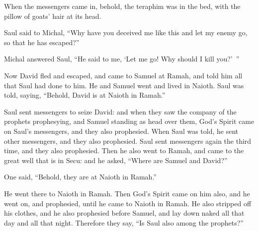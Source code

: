 {When the messengers came in, behold, the teraphim was in the bed, with the pillow of goats’ hair at its head.
\par }{\PP {}Saul said to Michal, “Why have you deceived me like this and let my enemy go, so that he has escaped?”
\par }{\PP Michal answered Saul, “He said to me, ‘Let me go! Why should I kill you?’ ”
\par }{\PP {}Now David fled and escaped, and came to Samuel at Ramah, and told him all that Saul had done to him. He and Samuel went and lived in Naioth.
Saul was told, saying, “Behold, David is at Naioth in Ramah.”
\par }{\PP {}Saul sent messengers to seize David: and when they saw the company of the prophets prophesying, and Samuel standing as head over them, God’s Spirit came on Saul’s messengers, and they also prophesied.
When Saul was told, he sent other messengers, and they also prophesied. Saul sent messengers again the third time, and they also prophesied.
Then he also went to Ramah, and came to the great well that is in Secu: and he asked, “Where are Samuel and David?”
\par }{\PP One said, “Behold, they are at Naioth in Ramah.”
\par }{\PP {}He went there to Naioth in Ramah. Then God’s Spirit came on him also, and he went on, and prophesied, until he came to Naioth in Ramah.
He also stripped off his clothes, and he also prophesied before Samuel, and lay down naked all that day and all that night. Therefore they say, “Is Saul also among the prophets?”

}
